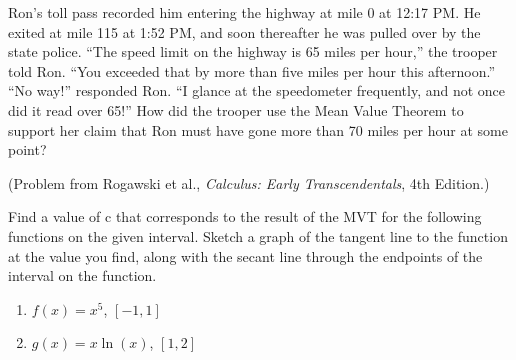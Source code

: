 \documentclass{ximera}
\begin{document}
\begin{exercise}
   Ron’s toll pass recorded him entering the highway at mile 0 at 12:17 PM. He exited at mile 115 at 1:52 PM, and soon thereafter he was pulled over by the state police. “The speed limit on the highway is 65 miles per hour,” the trooper told Ron. “You exceeded that by more than five miles per hour this afternoon.” “No way!” responded Ron. “I glance at the speedometer frequently, and not once did it read over 65!” How did the trooper use the Mean Value Theorem to support her claim that Ron must have gone more than 70 miles per hour at some point? 

(Problem from Rogawski et al., \textit{Calculus: Early Transcendentals}, 4th Edition.)
\end{exercise}

\begin{exercise}
    Find a value of c that corresponds to the result of the MVT for the following functions on the given interval.  Sketch a graph of the tangent line to the function at the value you find, along with the secant line through the endpoints of the interval on the function.
   \begin{enumerate}
       \item $f(x)=x^5$, $[-1,1]$
       \item $g(x)=x\ln(x)$, $[1,2]$
   \end{enumerate}
\end{exercise}
\end{document}
